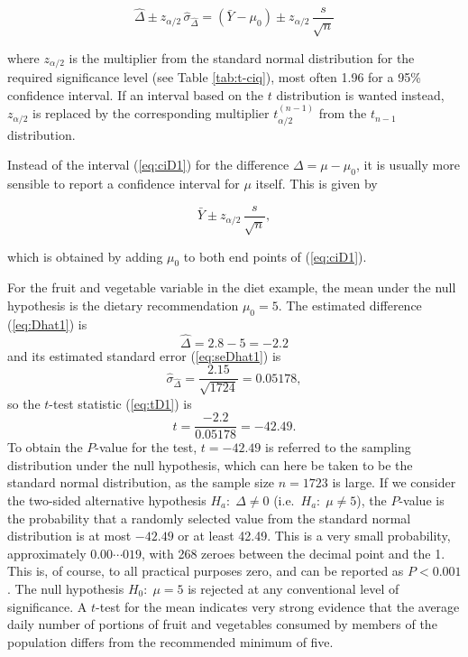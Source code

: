 \documentclass[11pt,a4paper,openany]{book}
\begin{document}
\begin{itemize}
  \begin{equation}\hat{\Delta}\pm z_{\alpha/2}\, \hat{\sigma}_{\hat{\Delta}}
  =
  (\bar{Y}-\mu_{0}) \pm z_{\alpha/2} \, \frac{s}{\sqrt{n}}
  \label{eq:ciD1}\end{equation}

  where \(z_{\alpha/2}\) is the multiplier from the standard normal
  distribution for the required significance level (see Table
  \ref{tab:t-ciq}), most often 1.96 for a 95\% confidence interval. If
  an interval based on the \(t\) distribution is wanted instead,
  \(z_{\alpha/2}\) is replaced by the corresponding multiplier
  \(t_{\alpha/2}^{(n-1)}\) from the \(t_{n-1}\) distribution.

  Instead of the interval (\ref{eq:ciD1}) for the difference
  \(\Delta=\mu-\mu_{0}\), it is usually more sensible to report a
  confidence interval for \(\mu\) itself. This is given by

  \begin{equation}\bar{Y} \pm z_{\alpha/2} \, \frac{s}{\sqrt{n}},
  \label{eq:cimu1}\end{equation}

  which is obtained by adding \(\mu_{0}\) to both end points of
  (\ref{eq:ciD1}).
\end{itemize}

For the fruit and vegetable variable in the diet example, the mean under
the null hypothesis is the dietary recommendation \(\mu_{0}=5\). The
estimated difference (\ref{eq:Dhat1}) is \[\hat{\Delta}=2.8-5=-2.2\] and
its estimated standard error (\ref{eq:seDhat1}) is
\[\hat{\sigma}_{\hat{\Delta}}= \frac{2.15}{\sqrt{1724}} = 0.05178,\] so
the \(t\)-test statistic (\ref{eq:tD1}) is
\[t=\frac{-2.2}{0.05178} = -42.49.\] To obtain the \(P\)-value for the
test, \(t=-42.49\) is referred to the sampling distribution under the
null hypothesis, which can here be taken to be the standard normal
distribution, as the sample size \(n=1723\) is large. If we consider the
two-sided alternative hypothesis \(H_{a}:\; \Delta\ne 0\)
(i.e.~\(H_{a}:\; \mu\ne5\)), the \(P\)-value is the probability that a
randomly selected value from the standard normal distribution is at most
\(-42.49\) or at least 42.49. This is a very small probability,
approximately \(0.00\cdots019\), with 268 zeroes between the decimal
point and the 1. This is, of course, to all practical purposes zero, and
can be reported as \(P<0.001\). The null hypothesis \(H_{0}:\; \mu=5\)
is rejected at any conventional level of significance. A \(t\)-test for
the mean indicates very strong evidence that the average daily number of
portions of fruit and vegetables consumed by members of the population
differs from the recommended minimum of five.
\end{document}
